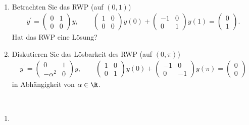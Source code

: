\begin{exercise}
\leavevmode \\
\begin{enumerate}[label = \textbf{\alph*)}]
  \item Betrachten Sie das RWP (auf $(0,1)$)
  \begin{align*}
    y^{\prime} = \begin{pmatrix}
      0 & 1 \\ 0 & 0
    \end{pmatrix}y, \qquad
    \begin{pmatrix}
      1 & 0 \\ 0 & 0
    \end{pmatrix}y(0)
    + \begin{pmatrix}
      -1 & 0 \\ 0 & 1
    \end{pmatrix}y(1)
    = \begin{pmatrix}
      0 \\ 1
    \end{pmatrix}.
  \end{align*}
  Hat das RWP eine Lösung?
  \item Diskutieren Sie das Lösbarkeit des RWP (auf $(0,\pi)$)
  \begin{align*}
  y^{\prime} = \begin{pmatrix}
    0 & 1 \\ -\alpha^2 & 0
  \end{pmatrix}y, \qquad
  \begin{pmatrix}
    1 & 0 \\ 0 & 1
  \end{pmatrix}y(0)
  + \begin{pmatrix}
    -1 & 0 \\ 0 & -1
  \end{pmatrix}y(\pi)
  = \begin{pmatrix}
    0 \\ 0
  \end{pmatrix}
  \end{align*}
  in Abhängigkeit von $\alpha \in \R$.
\end{enumerate}
\end{exercise}
\begin{solution}
\leavevmode \\
\begin{enumerate}[label = \textbf{\alph*)}]
  \item
\end{enumerate}
\end{solution}
